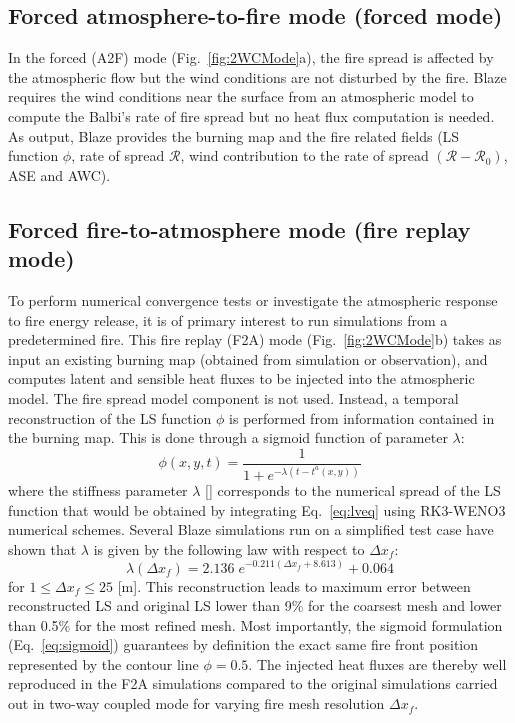 \subsection{Forced atmosphere-to-fire mode (forced mode)}
\label{ssec:cpl1A2F}

In the forced (A2F) mode (Fig.~\ref{fig:2WCMode}a), the fire spread is affected by the atmospheric flow but the wind conditions are not disturbed by the fire. Blaze requires the wind conditions near the surface from an atmospheric model to compute the Balbi's rate of fire spread but no heat flux computation is needed. As output, Blaze provides the burning map and the fire related fields (LS function $\phi$, rate of spread $\mathcal R$, wind contribution to the rate of spread $(\mathcal R - \mathcal R_0)$, ASE and AWC).

\subsection{Forced fire-to-atmosphere mode (fire replay mode)}
\label{ssec:cpl1F2A}

To perform numerical convergence tests or investigate the atmospheric response to fire energy release, it is of primary interest to run simulations from a predetermined fire. This fire replay (F2A) mode (Fig.~\ref{fig:2WCMode}b) takes as input an existing burning map (obtained from simulation or observation), and computes latent and sensible heat fluxes to be injected into the atmospheric model. The fire spread model component is not used. Instead, a temporal reconstruction of the LS function $\phi$ is performed from information contained in the burning map. This is done through a sigmoid function of parameter $\lambda$:
\begin{equation}
  \phi (x,y,t) = \frac{1}{1+ e^{-\lambda (t - t^a (x,y)) }}
  \label{eq:sigmoid}
\end{equation}
where the stiffness parameter $\lambda$ [\reciprocal \second] corresponds to the numerical spread of the LS function that would be obtained by integrating Eq.~\eqref{eq:lveq} using RK3-WENO3 numerical schemes. 
Several Blaze simulations run on a simplified test case have shown that $\lambda$ is given by the following law with respect to $\Delta x_f$:
\begin{equation}
 \lambda (\Delta x_f ) = 2.136 \; e^{-0.211 (\Delta x_f + 8.613)} + 0.064
\end{equation}
for $1 \leqslant \Delta x_f \leqslant 25 $ [m]. This reconstruction leads to maximum error between reconstructed LS and original LS lower than 9\% for the coarsest mesh and lower than 0.5\% for the most refined mesh. Most importantly, the sigmoid formulation (Eq.~\ref{eq:sigmoid}) guarantees by definition the exact same fire front position represented by the contour line $\phi=0.5$. The injected heat fluxes are thereby well reproduced in the F2A simulations compared to the original simulations carried out in two-way coupled mode for varying fire mesh resolution $\Delta x_f$.

